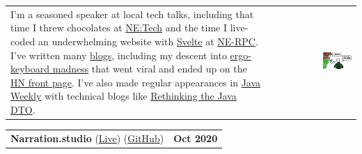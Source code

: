 \documentclass[hidelinks, 12pt, a4paper]{article}
\begin{document}
	\hspace{0.05\linewidth}\begin{tabularx}{0.95\linewidth}{Xr}
		\begin{minipage}{\linewidth}
			I'm a seasoned speaker at local tech talks, including that time I threw chocolates at \href{https://www.youtube.com/watch?v=2ibiA5TEsxw}{NE:Tech} and the time I live-coded an underwhelming website with \href{https://svelte.dev}{Svelte} at \href{https://www.youtube.com/watch?v=P6u0Uv_VxCU}{NE-RPC}.
			I've written many \href{https://stevenwaterman.uk/}{blogs}, including my descent into \href{https://blog.scottlogic.com/2020/10/09/ergo-rabbit-hole.html}{ergo-keyboard madness} that went viral and ended up on the \href{https://news.ycombinator.com/item?id=24728224}{HN front page}.
			I've also made regular appearances in \href{https://www.baeldung.com/java-weekly-315}{Java Weekly} with technical blogs like \href{https://blog.scottlogic.com/2020/01/03/rethinking-the-java-dto.html}{Rethinking the Java DTO}.
		\end{minipage} & \href{https://blog.scottlogic.com/2020/10/09/ergo-rabbit-hole.html}{\includegraphics[align=c, width=0.36\textwidth]{keyboard}}
	\end{tabularx}

	\vspace{24pt}
	
	\begin{tabularx}{\linewidth}{X r}
		\textbf{Narration.studio} (\href{https://narration.studio/}{Live}) (\href{https://github.com/stevenwaterman/narration.studio/}{GitHub}) & \textbf{Oct 2020}
	\end{tabularx}\vspace{2pt}
\end{document}
